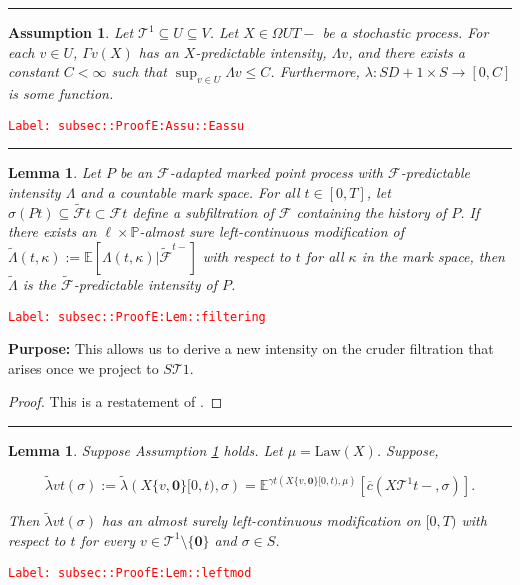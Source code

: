 \documentclass[12pt]{article}
\newcommand{\mb}{\mathbb}
\newcommand{\mc}{\mathcal}
\newcommand{\ra}{\rightarrow}
\newcommand{\ov}{\overline}
\newcommand{\te}{\text}
\newcommand{\tr}{\textcolor{red}}
\newcommand{\labe}[1]{\tr{\texttt{Label: #1}}}
\newcommand{\purpose}{\textbf{Purpose: }}
\newcommand{\lin}{\rule{\linewidth}{0.4 pt}}
\newcommand{\pr}{\mb{P}}							%
\newcommand{\ex}[1]{\mb{E}\left[#1\right]}			%
\newcommand{\exmu}[2]{\mb{E}^{#1}\left[#2\right]}	%
\renewcommand{\root}{\mathbf{0}}				%
\renewcommand{\v}{v}							%
\renewcommand{\U}{U}							%
\renewcommand{\S}{S}							%
\newcommand{\s}{\sigma}							%
\newcommand{\T}{T}								%
\renewcommand{\t}{t}							%
\newcommand{\F}{\mc{F}}							%
\newcommand{\X}{X}								%
\newcommand{\const}{C}							%
\newcommand{\degr}{D}							%
\newcommand{\IGrg}{\ov{c}}						%
\newcommand{\tree}{\mc{T}}						%
\newcommand{\sln}[1]{^{#1}}						%
\newcommand{\Sm}{\ell}							%
\newcommand{\alt}[1]{\widetilde{#1}}			%
\newcommand{\m}{\mu}							%
\newcommand{\cm}{\gamma}						%
\newcommand{\law}{\te{Law}}						%
\newcommand{\pmap}{\Gamma}						%
\renewcommand{\mark}{\kappa}					%
\newcommand{\rp}{P}								%
\newcommand{\ratee}{\Lambda}					%
\newcommand{\crate}{\alt{\lambda}}				%
\newcommand{\cratee}{\alt{\Lambda}} 			%
\newtheorem{lem}[thms]{Lemma}
\newtheorem{assu}[thms]{Assumption}
\begin{document}
\lin

\begin{assu}
Let \(\tree\sln{1}\subseteq\U \subseteq V\). Let \(\X{}{}\in \Omega{\U}{\T-}\) be a stochastic process. For each \(\v\in \U\), \(\pmap{\v}(\X{}{})\) has an \(\X{}{}\)-predictable intensity, \(\ratee{\v}\), and there exists a constant \(\const{} < \infty\) such that \(\sup_{\v\in\U} \ratee{\v} \leq \const{}\). Furthermore, \(\lambda: \S{\degr+1}\times \S\ra[0,\const{}]\) is some function.
\label{subsec::ProofE:Assu::Eassu}
\end{assu}
\labe{subsec::ProofE:Assu::Eassu}

\lin

\begin{lem}
Let \(\rp{}\) be an \(\F{}{}\)-adapted marked point process with \(\F{}{}\)-predictable intensity \(\ratee{}\) and a countable mark space. For all \(\t \in [0,\T]\), let \(\sigma(\rp{\t}) \subseteq \alt{\F{}}{\t}\subset \F{}{\t}\) define a subfiltration of \(\F{}{}\) containing the history of \(\rp{}\). If there exists an \(\Sm\times \pr\)-almost sure left-continuous modification of \(\cratee{}{}(\t,\mark{}) := \ex{\ratee{}(\t,\mark{})|\alt{\F{}{}}^{\t-}}\) with respect to \(\t\) for all \(\mark{}\) in the mark space, then \(\cratee{}{}\) is the \(\alt{\F{}{}}\)-predictable intensity of \(\rp{}\).
\label{subsec::ProofE:Lem::filtering}
\end{lem}
\labe{subsec::ProofE:Lem::filtering}

\purpose This allows us to derive a new intensity on the cruder filtration that arises once we project to \(\S{\tree{1}}\).

\begin{proof}
This is a restatement of \cite[Theorem 14.3.III]{DalVer08}.
\end{proof}

\lin

\begin{lem}
Suppose Assumption \ref{subsec::ProofE:Assu::Eassu} holds. Let \(\m{}{}{} = \law(\X{}{})\). Suppose,

\[\crate{\v}{\t}(\s) := \crate{}{}(\X{\{\v,\root\}}{[0,\t)},\s) = \exmu{\cm{\t}(\X{\{\v,\root\}}{[0,\t)},\m{}{}{})}{\IGrg(\X{\tree\sln{1}}{\t-},\s)}.\]


Then \(\crate{\v}{\t}(\s)\) has an almost surely left-continuous modification on \([0,\T)\) with respect to \(\t\) for every \(\v \in \tree\sln{1}\setminus\{\root\}\) and \(\s \in \S\).
\label{subsec::ProofE:Lem::leftmod}
\end{lem}
\labe{subsec::ProofE:Lem::leftmod}
\end{document}
